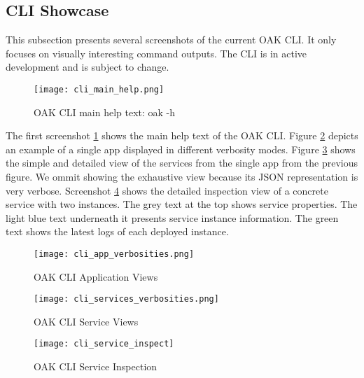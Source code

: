 \subsection{CLI Showcase}

This subsection presents several screenshots of the current OAK CLI.
It only focuses on visually interesting command outputs. 
The CLI is in active development and is subject to change.

\begin{figure}[h]
    \begin{adjustwidth}{-0.1\paperwidth}{-0.1\paperwidth}
        \centering
        \texttt{[image: cli\_main\_help.png]}
        \caption{OAK CLI main help text: oak -h}
        \label{fig:cli_main_help}
    \end{adjustwidth}
\end{figure}
The first screenshot \ref{fig:cli_main_help} shows the main help text of the OAK CLI.
Figure \ref{fig:cli_app_views} depicts an example of a single app displayed in different verbosity modes.
Figure \ref{fig:cli_service_views} shows the simple and detailed view of the services from the single app from the previous figure.
We ommit showing the exhaustive view because its JSON representation is very verbose.
Screenshot \ref{fig:cli_service_inspection} shows the detailed inspection view of a concrete service with two instances.
The grey text at the top shows service properties.
The light blue text underneath it presents service instance information.
The green text shows the latest logs of each deployed instance.

\begin{figure}[h]
    \begin{adjustwidth}{-0.2\paperwidth}{-0.2\paperwidth}
        \centering
        \texttt{[image: cli\_app\_verbosities.png]}
        \caption{OAK CLI Application Views}
        \label{fig:cli_app_views}
    \end{adjustwidth}
\end{figure}

\begin{figure}[p]
    \centering
    \texttt{[image: cli\_services\_verbosities.png]}
    \caption{OAK CLI Service Views}
    \label{fig:cli_service_views}
\end{figure}

\begin{figure}[p]
    \begin{adjustwidth}{-0.1\paperwidth}{-0.1\paperwidth}
        \centering
        \texttt{[image: cli\_service\_inspect]}
        \caption{OAK CLI Service Inspection}
        \label{fig:cli_service_inspection}
    \end{adjustwidth}
\end{figure}
